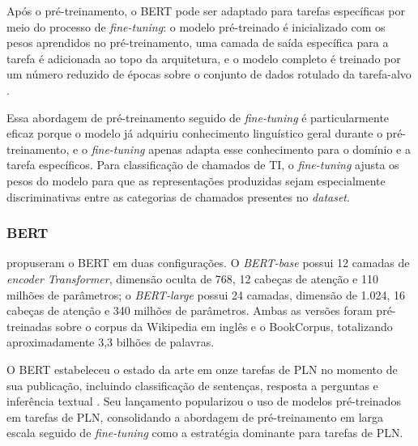\documentclass[
    12pt,                %
    openright,           %
    oneside,             %
    a4paper,             %
    english,             %
    brazil               %
]{abntex2}
\begin{document}
\label{subsubsec:bert_finetune}

Após o pré-treinamento, o BERT pode ser adaptado para tarefas específicas por meio do processo de \textit{fine-tuning}: o modelo pré-treinado é inicializado com os pesos aprendidos no pré-treinamento, uma camada de saída específica para a tarefa é adicionada ao topo da arquitetura, e o modelo completo é treinado por um número reduzido de épocas sobre o conjunto de dados rotulado da tarefa-alvo \cite{devlin2019}.

Essa abordagem de pré-treinamento seguido de \textit{fine-tuning} é particularmente eficaz porque o modelo já adquiriu conhecimento linguístico geral durante o pré-treinamento, e o \textit{fine-tuning} apenas adapta esse conhecimento para o domínio e a tarefa específicos. Para classificação de chamados de TI, o \textit{fine-tuning} ajusta os pesos do modelo para que as representações produzidas sejam especialmente discriminativas entre as categorias de chamados presentes no \textit{dataset}.

\subsubsection{BERT}
\label{subsec:bert_modelo}

\label{subsubsec:bert_arquitetura}

 propuseram o BERT em duas configurações. O \textit{BERT-base} possui 12 camadas de \textit{encoder} \textit{Transformer}, dimensão oculta de 768, 12 cabeças de atenção e 110 milhões de parâmetros; o \textit{BERT-large} possui 24 camadas, dimensão de 1.024, 16 cabeças de atenção e 340 milhões de parâmetros. Ambas as versões foram pré-treinadas sobre o corpus da Wikipedia em inglês e o BookCorpus, totalizando aproximadamente 3,3 bilhões de palavras.

O BERT estabeleceu o estado da arte em onze tarefas de PLN no momento 
de sua publicação, incluindo classificação de sentenças, resposta a perguntas e inferência textual \cite{devlin2019}. Seu lançamento popularizou o uso de modelos pré-treinados em tarefas 
de PLN, consolidando a abordagem de pré-treinamento em larga escala 
seguido de \textit{fine-tuning} como a estratégia dominante para 
tarefas de PLN.
\end{document}

